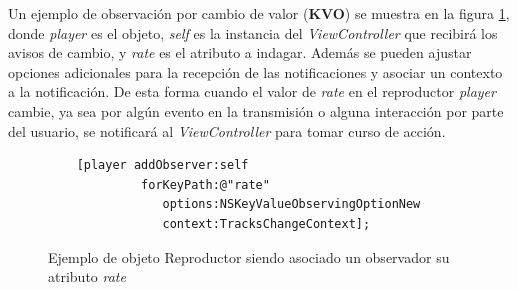 Un ejemplo de observación por cambio de valor (\textbf{KVO}) se muestra en la figura \ref{exampleCodeObserver}, donde \textit{player} es el objeto, \textit{self} es la instancia del \textit{ViewController} que recibirá los avisos de cambio, y \textit{rate} es el atributo a indagar. Además se pueden ajustar opciones adicionales para la recepción de las notificaciones y asociar un contexto a la notificación. De esta forma cuando el valor de \textit{rate} en el reproductor \textit{player} cambie, ya sea por algún evento en la transmisión o alguna interacción por parte del usuario, se notificará al \textit{ViewController} para tomar curso de acción.
\begin{figure}[h!]
	\centering
	\begin{lstlisting}
	[player addObserver:self  
			 forKeyPath:@"rate"
		        options:NSKeyValueObservingOptionNew
		        context:TracksChangeContext];
	\end{lstlisting}
	\caption{Ejemplo de objeto Reproductor siendo asociado un observador su atributo \textit{rate}}
	\label{exampleCodeObserver}	
\end{figure}	
 
